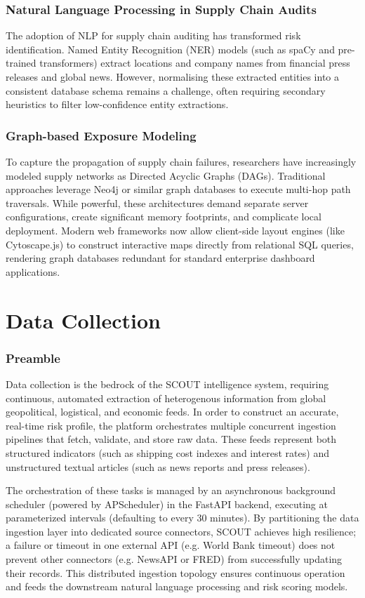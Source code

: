 \documentclass[12pt]{report}
\begin{document}
\subsection{Natural Language Processing in Supply Chain Audits}
The adoption of NLP for supply chain auditing has transformed risk identification. Named Entity Recognition (NER) models (such as spaCy and pre-trained transformers) extract locations and company names from financial press releases and global news. However, normalising these extracted entities into a consistent database schema remains a challenge, often requiring secondary heuristics to filter low-confidence entity extractions.

\subsection{Graph-based Exposure Modeling}
To capture the propagation of supply chain failures, researchers have increasingly modeled supply networks as Directed Acyclic Graphs (DAGs). Traditional approaches leverage Neo4j or similar graph databases to execute multi-hop path traversals. While powerful, these architectures demand separate server configurations, create significant memory footprints, and complicate local deployment. Modern web frameworks now allow client-side layout engines (like Cytoscape.js) to construct interactive maps directly from relational SQL queries, rendering graph databases redundant for standard enterprise dashboard applications.

\newpage
\chapter{Data Collection}
\thispagestyle{fancy}

\subsection{Preamble}
Data collection is the bedrock of the SCOUT intelligence system, requiring continuous, automated extraction of heterogenous information from global geopolitical, logistical, and economic feeds. In order to construct an accurate, real-time risk profile, the platform orchestrates multiple concurrent ingestion pipelines that fetch, validate, and store raw data. These feeds represent both structured indicators (such as shipping cost indexes and interest rates) and unstructured textual articles (such as news reports and press releases).

The orchestration of these tasks is managed by an asynchronous background scheduler (powered by APScheduler) in the FastAPI backend, executing at parameterized intervals (defaulting to every 30 minutes). By partitioning the data ingestion layer into dedicated source connectors, SCOUT achieves high resilience; a failure or timeout in one external API (e.g. World Bank timeout) does not prevent other connectors (e.g. NewsAPI or FRED) from successfully updating their records. This distributed ingestion topology ensures continuous operation and feeds the downstream natural language processing and risk scoring models.
\end{document}
